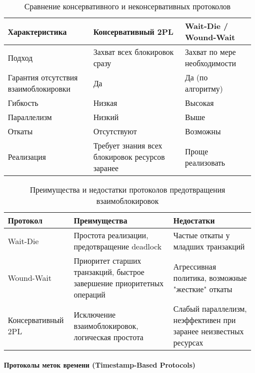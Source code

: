  \begin{table}[H]
     \centering
     \caption{Сравнение консервативного и неконсервативных протоколов}
     \begin{tabular}{|p{5cm}|p{5cm}|p{5cm}|}
         \hline
         \textbf{Характеристика} & \textbf{Консервативный 2PL} & \textbf{Wait-Die / Wound-Wait} \\
         \hline
         Подход & Захват всех блокировок сразу & Захват по мере необходимости \\
         \hline
         Гарантия отсутствия взаимоблокировки & Да & Да (по алгоритму) \\
         \hline
         Гибкость & Низкая & Высокая \\
         \hline
         Параллелизм & Низкий & Выше \\
         \hline
         Откаты & Отсутствуют & Возможны \\
         \hline
         Реализация & Требует знания всех блокировок ресурсов заранее & Проще реализовать \\
         \hline
     \end{tabular}
 \end{table}
     
 \begin{table}[H]
     \centering
     \caption{Преимущества и недостатки протоколов предотвращения взаимоблокировок}
     \begin{tabular}{|l|p{6cm}|p{6cm}|}
         \hline
         \textbf{Протокол} & \textbf{Преимущества} & \textbf{Недостатки} \\
         \hline
         Wait-Die & Простота реализации, предотвращение deadlock & Частые откаты у младших транзакций \\
         \hline
         Wound-Wait & Приоритет старших транзакций, быстрое завершение приоритетных операций & Агрессивная политика, возможные "жесткие" откаты \\
         \hline
         Консервативный 2PL & Исключение взаимоблокировок, логическая простота & Слабый параллелизм, неэффективен при заранее неизвестных ресурсах \\
         \hline
     \end{tabular}
 \end{table}
    
\paragraph{Протоколы меток времени (Timestamp-Based Protocols)} ~\\

